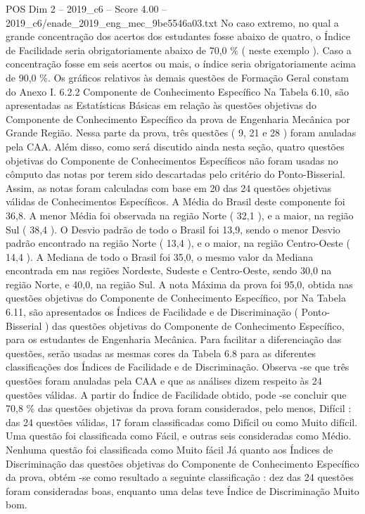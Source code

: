\begin{textsample}{POS Dim 2 – 2019\_c6 – Score 4.00 – 2019\_c6/enade\_2019\_eng\_mec\_9be5546a03.txt}
No caso extremo, no qual a grande concentração dos acertos dos estudantes fosse abaixo de quatro, o Índice de Facilidade seria obrigatoriamente abaixo de 70,0 \% ( neste exemplo ).
Caso a concentração fosse em seis acertos ou mais, o índice seria obrigatoriamente acima de 90,0 \%.
Os gráficos relativos às demais questões de Formação Geral constam do Anexo I. 6.2.2 Componente de Conhecimento Específico Na Tabela 6.10, são apresentadas as Estatísticas Básicas em relação às questões objetivas do Componente de Conhecimento Específico da prova de Engenharia Mecânica por Grande Região.
Nessa parte da prova, três questões ( 9, 21 e 28 ) foram anuladas pela CAA.
Além disso, como será discutido ainda nesta seção, quatro questões objetivas do Componente de Conhecimentos Específicos não foram usadas no cômputo das notas por terem sido descartadas pelo critério do Ponto-Bisserial.
Assim, as notas foram calculadas com base em 20 das 24 questões objetivas válidas de Conhecimentos Específicos.
A Média do Brasil deste componente foi 36,8.
A menor Média foi observada na região Norte ( 32,1 ), e a maior, na região Sul ( 38,4 ).
O Desvio padrão de todo o Brasil foi 13,9, sendo o menor Desvio padrão encontrado na região Norte ( 13,4 ), e o maior, na região Centro-Oeste ( 14,4 ).
A Mediana de todo o Brasil foi 35,0, o mesmo valor da Mediana encontrada em nas regiões Nordeste, Sudeste e Centro-Oeste, sendo 30,0 na região Norte, e 40,0, na região Sul.
A nota Máxima da prova foi 95,0, obtida nas questões objetivas do Componente de Conhecimento Específico, por Na Tabela 6.11, são apresentados os Índices de Facilidade e de Discriminação ( Ponto-Bisserial ) das questões objetivas do Componente de Conhecimento Específico, para os estudantes de Engenharia Mecânica.
Para facilitar a diferenciação das questões, serão usadas as mesmas cores da Tabela 6.8 para as diferentes classificações dos Índices de Facilidade e de Discriminação.
Observa -se que três questões foram anuladas pela CAA e que as análises dizem respeito às 24 questões válidas.
A partir do Índice de Facilidade obtido, pode -se concluir que 70,8 \% das questões objetivas da prova foram considerados, pelo menos, Difícil : das 24 questões válidas, 17 foram classificadas como Difícil ou como Muito difícil.
Uma questão foi classificada como Fácil, e outras seis consideradas como Médio.
Nenhuma questão foi classificada como Muito fácil Já quanto aos Índices de Discriminação das questões objetivas do Componente de Conhecimento Específico da prova, obtém -se como resultado a seguinte classificação : dez das 24 questões foram consideradas boas, enquanto uma delas teve Índice de Discriminação Muito bom.

\end{textsample}
